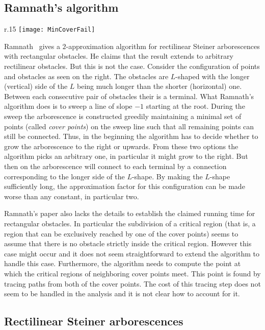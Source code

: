 \documentclass{journalA4}
\begin{document}
\subsection{Ramnath's algorithm}\label{sec:ramnath}

\begin{wrapfigure}[7]{r}{.15\textwidth}
  \centering
  \texttt{[image: MinCoverFail]}
\end{wrapfigure}
Ramnath~\cite{Ramnath03} gives a $2$-approximation algorithm for rectilinear Steiner arborescences with rectangular obstacles. He claims that the result extends to arbitrary rectilinear obstacles. But this is not the case. Consider the configuration of points and obstacles as seen on the right. The obstacles are $L$-shaped with the longer (vertical) side of the $L$ being much longer than the shorter (horizontal) one. Between each consecutive pair of obstacles their is a terminal. What Ramnath's algorithm does is to sweep a line of slope $-1$ starting at the root. During the sweep the arborescence is constructed greedily maintaining a minimal set of points (called \emph{cover points}) on the sweep line such that all remaining points can still be connected. Thus, in the beginning the algorithm has to decide whether to grow the arborescence to the right or upwards. From these two options the algorithm picks an arbitrary one, in particular it might grow to the right. But then on the arborescence will connect to each terminal by a connection corresponding to the longer side of the $L$-shape. By making the $L$-shape sufficiently long, the approximation factor for this configuration can be made worse than any constant, in particular two.

Ramnath's paper also lacks the details to establish the claimed running time for rectangular obstacles. In particular the subdivision of a critical region (that is, a region that can be exclusively reached by one of the cover points) seems to assume that there is no obstacle strictly inside the critical region. However this case might occur and it does not seem straightforward to extend the algorithm to handle this case. Furthermore, the algorithm needs to compute the point at which the critical regions of neighboring cover points meet. This point is found by tracing paths from both of the cover points. The cost of this tracing step does not seem to be handled in the analysis and it is not clear how to account for it.

\subsection{Rectilinear Steiner arborescences}\label{sec:rectisweep}
\end{document}
